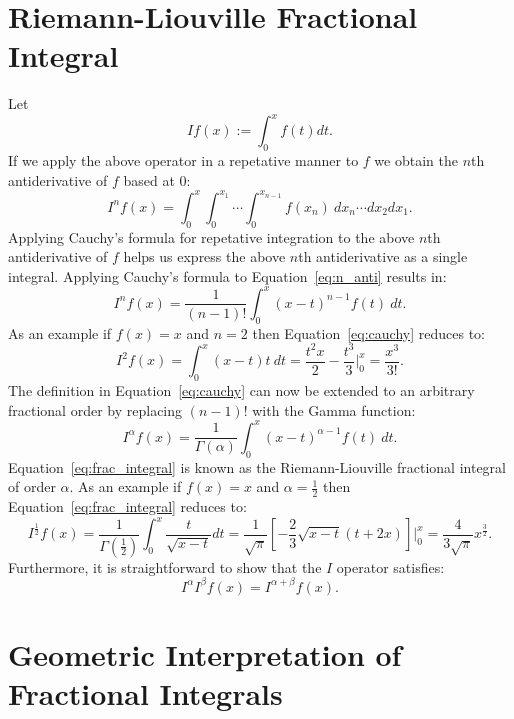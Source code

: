 \documentclass{article}
\theoremstyle{theorem}
\theoremstyle{definition}
\begin{document}
\section{Riemann-Liouville Fractional Integral}
Let
\begin{equation}
If(x) := \int_0^x f(t) dt.
\end{equation}
If we apply the above operator in a repetative manner to $f$ we obtain the $n$th antiderivative of $f$ based at 0:
\begin{equation}
\label{eq:n_anti}
I^nf(x) = \int_0^x\int_0^{x_1}\cdots \int_0^{x_{n-1}}f(x_n)~dx_n\cdots dx_2 dx_1.
\end{equation}
Applying Cauchy's formula for repetative integration to the above $n$th antiderivative of $f$ helps us express the above $n$th antiderivative as a single integral. 
Applying Cauchy's formula to Equation~\ref{eq:n_anti} results in:
\begin{equation}
\label{eq:cauchy}
I^nf(x) = \frac{1}{(n-1)!}\int_0^x (x-t)^{n-1}f(t)~dt.
\end{equation}
As an example if $f(x)=x$ and $n=2$ then Equation~\ref{eq:cauchy} reduces to:
\begin{equation}
I^2f(x) = \int_0^x (x-t)t~dt = \frac{t^2x}{2} - \frac{t^3}{3} \Bigg |_0^x = \frac{x^3}{3!}.
\end{equation}
The definition in Equation~\ref{eq:cauchy} can now be extended to an arbitrary fractional order by replacing $(n-1)!$ with the Gamma function:
\begin{equation}
\label{eq:frac_integral}
I^{\alpha}f(x) = \frac{1}{\Gamma(\alpha)}\int_0^x (x-t)^{\alpha-1}f(t)~dt.
\end{equation}
Equation~\ref{eq:frac_integral} is known as the Riemann-Liouville fractional integral of order $\alpha$. As an example if $f(x)=x$ and $\alpha=\frac{1}{2}$ then 
Equation~\ref{eq:frac_integral} reduces to:
\begin{equation}
I^{\frac{1}{2}}f(x) = \frac{1}{\Gamma(\frac{1}{2})} \int_0^x \frac{t}{\sqrt{x-t}} dt = \frac{1}{\sqrt{\pi}}\left [ -\frac{2}{3}\sqrt{x-t}(t+2x)\right] \Bigg |_0^x=\frac{4}{3\sqrt{\pi}}x^{\frac{3}{2}}. 
\end{equation}
Furthermore, it is straightforward to show that the $I$ operator satisfies:
\begin{equation}
I^{\alpha}I^{\beta}f(x) = I^{\alpha+\beta}f(x). 
\end{equation}

\section{Geometric Interpretation of Fractional Integrals}
\end{document}

